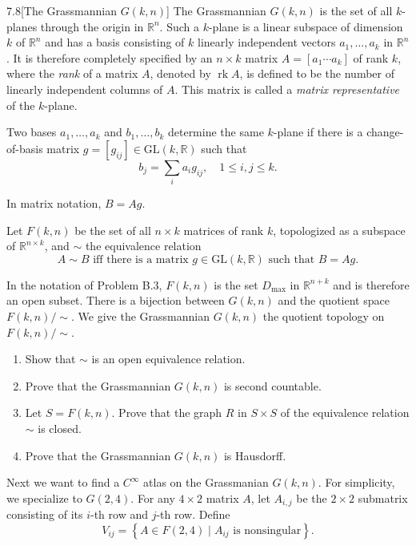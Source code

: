 \begin{problem}{7.8}[The Grassmannian \(G(k, n)\)]
The Grassmannian \( G(k, n) \) is the set of all \(k\)-planes through the origin in \( \mathbb{R}^{n} \). Such a \(k\)-plane is a linear subspace of dimension \(k\) of \( \mathbb{R}^{n} \) and has a basis consisting of \(k\) linearly independent vectors \( a_{1}, \ldots, a_{k} \) in \( \mathbb{R}^{n} \). It is therefore completely specified by an \( n\times k \) matrix \(A = [a_{1} \cdots a_{k}]\) of rank \(k\), where the \textit{rank} of a matrix \(A\), denoted by \(\operatorname{rk}A\), is defined to be the number of linearly independent columns of \(A\). This matrix is called a \textit{matrix representative} of the \(k\)-plane.

Two bases \( a_{1}, \ldots, a_{k} \) and \( b_{1}, \ldots, b_{k} \) determine the same \(k\)-plane if there is a change-of-basis matrix \(g = [g_{ij}] \in \mathrm{GL}(k, \mathbb{R})\) such that
\[
	b_{j} = \sum_{i} a_{i}g_{ij},\quad 1 \leq i, j\leq k.
\]

In matrix notation, \( B = Ag \).

Let \(F(k, n)\) be the set of all \(n\times k\) matrices of rank \(k\), topologized as a subspace of \( \mathbb{R}^{n\times k} \), and \(\sim\) the equivalence relation
\[
	A \sim B \text{  iff  } \text{there is a matrix } g \in \mathrm{GL}(k, \mathbb{R}) \text{ such that } B = Ag.
\]

In the notation of Problem B.3, \( F(k, n) \) is the set \( D_{\max} \) in \( \mathbb{R}^{n+k} \) and is therefore an open subset. There is a bijection between \( G(k, n) \) and the quotient space \( F(k,n)/\!\sim \). We give the Grassmannian \(G(k, n)\) the quotient topology on \( F(k,n)/\!\sim \).
\begin{enumerate}[label={(\alph*)},leftmargin=*]
	\item Show that \( \sim \) is an open equivalence relation.
	\item Prove that the Grassmannian \( G(k, n) \) is second countable.
	\item Let \( S = F(k,n) \). Prove that the graph \( R \) in \( S\times S \) of the equivalence relation \( \sim \) is closed.
	\item Prove that the Grassmannian \( G(k, n) \) is Hausdorff.
\end{enumerate}

Next we want to find a \( C^{\infty} \) atlas on the Grassmanian \( G(k, n) \). For simplicity, we specialize to \( G(2, 4) \). For any \( 4\times 2 \) matrix \(A\), let \( A_{i,j} \) be the \(2\times 2\) submatrix consisting of its \(i\)-th row and \(j\)-th row. Define
\[
	V_{ij} = \left\{ A \in F(2, 4) \mid A_{ij} \text{ is nonsingular} \right\}.
\]


\end{problem}
